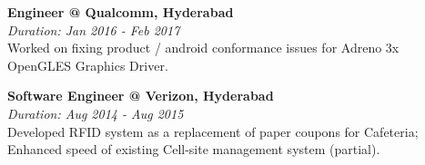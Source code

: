 \textbf{Engineer @ Qualcomm, Hyderabad} \\
\emph{Duration: Jan 2016 - Feb 2017} \\
Worked on fixing product / android conformance issues for Adreno 3x OpenGLES Graphics Driver.

\noindent
\textbf{Software Engineer @ Verizon, Hyderabad} \\
\emph{Duration: Aug 2014 - Aug 2015} \\
Developed RFID system as a replacement of paper coupons for Cafeteria; \\
Enhanced speed of existing Cell-site management system (partial).
